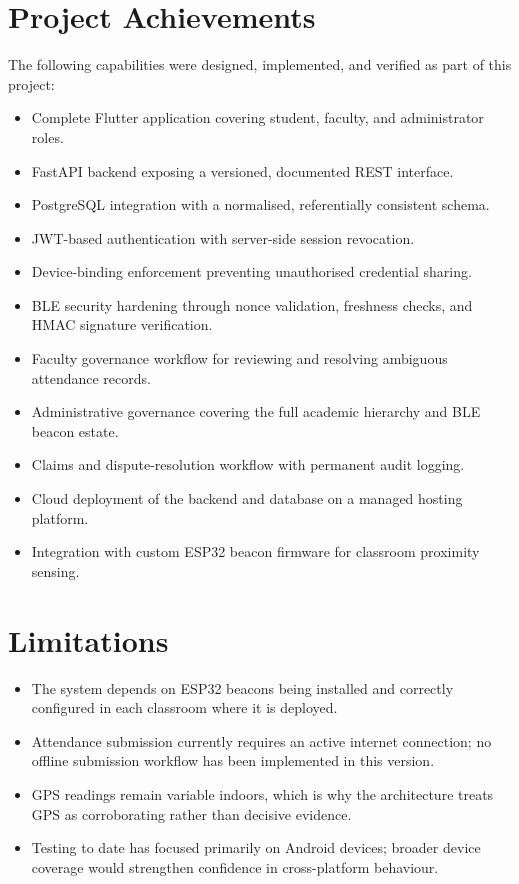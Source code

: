 \documentclass[12pt, a4paper, oneside]{report}
\begin{document}
\section{Project Achievements}

The following capabilities were designed, implemented, and verified as part of this project:

\begin{itemize}
    \item Complete Flutter application covering student, faculty, and administrator roles.
    \item FastAPI backend exposing a versioned, documented REST interface.
    \item PostgreSQL integration with a normalised, referentially consistent schema.
    \item JWT-based authentication with server-side session revocation.
    \item Device-binding enforcement preventing unauthorised credential sharing.
    \item BLE security hardening through nonce validation, freshness checks, and HMAC signature verification.
    \item Faculty governance workflow for reviewing and resolving ambiguous attendance records.
    \item Administrative governance covering the full academic hierarchy and BLE beacon estate.
    \item Claims and dispute-resolution workflow with permanent audit logging.
    \item Cloud deployment of the backend and database on a managed hosting platform.
    \item Integration with custom ESP32 beacon firmware for classroom proximity sensing.
\end{itemize}

\section{Limitations}
\begin{itemize}
    \item The system depends on ESP32 beacons being installed and correctly configured in each classroom where it is deployed.
    \item Attendance submission currently requires an active internet connection; no offline submission workflow has been implemented in this version.
    \item GPS readings remain variable indoors, which is why the architecture treats GPS as corroborating rather than decisive evidence.
    \item Testing to date has focused primarily on Android devices; broader device coverage would strengthen confidence in cross-platform behaviour.
\end{itemize}
\end{document}

